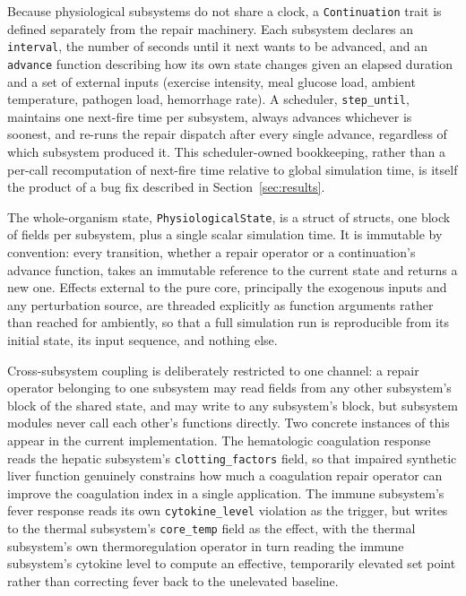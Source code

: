 \documentclass[11pt]{article}
\begin{document}
Because physiological subsystems do not share a clock, a \texttt{Continuation} trait is defined separately from the repair machinery. Each subsystem declares an \texttt{interval}, the number of seconds until it next wants to be advanced, and an \texttt{advance} function describing how its own state changes given an elapsed duration and a set of external inputs (exercise intensity, meal glucose load, ambient temperature, pathogen load, hemorrhage rate). A scheduler, \texttt{step\_until}, maintains one next-fire time per subsystem, always advances whichever is soonest, and re-runs the repair dispatch after every single advance, regardless of which subsystem produced it. This scheduler-owned bookkeeping, rather than a per-call recomputation of next-fire time relative to global simulation time, is itself the product of a bug fix described in Section~\ref{sec:results}.

The whole-organism state, \texttt{PhysiologicalState}, is a struct of structs, one block of fields per subsystem, plus a single scalar simulation time. It is immutable by convention: every transition, whether a repair operator or a continuation's advance function, takes an immutable reference to the current state and returns a new one. Effects external to the pure core, principally the exogenous inputs and any perturbation source, are threaded explicitly as function arguments rather than reached for ambiently, so that a full simulation run is reproducible from its initial state, its input sequence, and nothing else.

Cross-subsystem coupling is deliberately restricted to one channel: a repair operator belonging to one subsystem may read fields from any other subsystem's block of the shared state, and may write to any subsystem's block, but subsystem modules never call each other's functions directly. Two concrete instances of this appear in the current implementation. The hematologic coagulation response reads the hepatic subsystem's \texttt{clotting\_factors} field, so that impaired synthetic liver function genuinely constrains how much a coagulation repair operator can improve the coagulation index in a single application. The immune subsystem's fever response reads its own \texttt{cytokine\_level} violation as the trigger, but writes to the thermal subsystem's \texttt{core\_temp} field as the effect, with the thermal subsystem's own thermoregulation operator in turn reading the immune subsystem's cytokine level to compute an effective, temporarily elevated set point rather than correcting fever back to the unelevated baseline.
\end{document}
